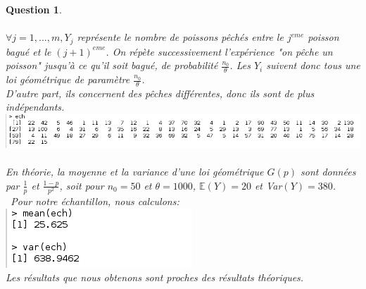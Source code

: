 \documentclass[a4paper,11pt]{article}
\newtheorem{exo2}{Question}
\begin{document}
\begin{exo2} \ \\ \\
    $\forall j = 1,...,m , Y_{j}$ représente le nombre de poissons pêchés entre le $j^{eme}$
    poisson bagué et le $(j+1)^{eme}$.
On répète successivement l'expérience "on pêche un poisson" jusqu'à ce qu'il soit bagué,
de probabilité $\frac{n_0}{\theta}$. Les $Y_i$ suivent donc tous une loi géométrique de paramètre
$\frac{n_0}{\theta}$.\ \\D'autre part, ils concernent des pêches différentes, donc ils sont
de plus indépendants.\ \\
\includegraphics[scale=0.5]{images/Q2_1_1.png}
\\ \\
En théorie, la moyenne et la variance d'une loi géométrique $G(p)$ sont données par $\frac{1}{p}$ et $\frac{1-p}{p^2}$, soit pour $n_0 = 50$ et $\theta = 1000$, $\mathbb{E}(Y) = 20$ et Var$(Y) = 380$. \ 
Pour notre échantillon, nous calculons:\ \\
\includegraphics[scale=0.5]{images/Q2_1_2.png} \ \\
Les résultats que nous obtenons sont proches des résultats théoriques.
\end{exo2}
\end{document}
